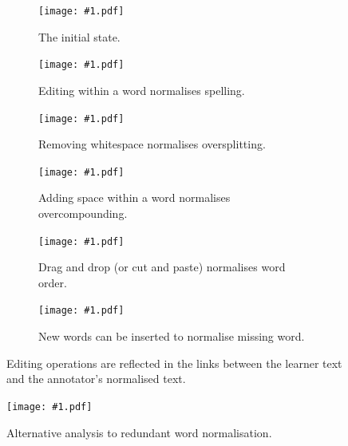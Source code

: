 \documentclass[10pt, a4paper]{article}
\begin{document}
\begin{figure}
\centering
\newcommand{\features}[2]{
\begin{subfigure}[t]{0.5\textwidth}
\texttt{[image: \#1.pdf]}
\caption{#2 \label{fig:#1}}
\end{subfigure}
}
\features{features0}{The initial state.}
\features{features1}{Editing within a word normalises spelling.}
\features{features2}{Removing whitespace normalises oversplitting.}
\features{features3}{Adding space within a word normalises overcompounding.}
\features{features4}{Drag and drop (or cut and paste) normalises word order.}
\features{features5}{New words can be inserted to normalise missing word.}
\caption{Editing operations are reflected in the links
between the learner text and the annotator's normalised text.}
\end{figure}

\newcommand{\featuresF}[2]{
\begin{figure}[t]
\texttt{[image: \#1.pdf]}
\caption{#2 \label{fig:#1}}
\end{figure}
}
\featuresF{features6}{Alternative analysis to redundant word normalisation.}
\end{document}
